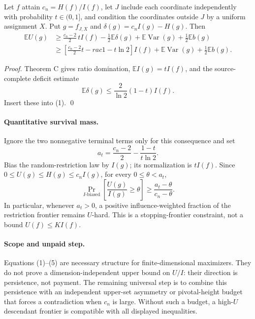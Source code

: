 \begin{corollary}
Let $f$ attain $c_n=H(f)/I(f)$, let $J$ include each coordinate independently
with probability $t\in(0,1]$, and condition the coordinates outside $J$ by a
uniform assignment $X$.  Put $g=f_{J,X}$ and
$\delta(g)=c_nI(g)-H(g)$.  Then
\[
\begin{split}
 \mathbb E U(g)
 &\ge \frac{c_n-2}{2}\,tI(f)-\frac12\mathbb E\delta(g)
       +\mathbb E\operatorname{Var}(g)+\frac12\mathbb E b(g)             \tag{3}\\
 &\ge \left[\frac{c_n-2}{2}t-rac{1-t}{\ln2}\right]I(f)
       +\mathbb E\operatorname{Var}(g)+\frac12\mathbb E b(g).           \tag{4}
\end{split}
\]
\end{corollary}

\begin{proof}
Theorem C gives ratio domination, $\mathbb E I(g)=tI(f)$, and the
source-complete deficit estimate
\[
 \mathbb E\delta(g)\le\frac{2}{\ln2}(1-t)I(f).
\]
Insert these into (1).  \qed
\end{proof}

\paragraph{Quantitative survival mass.}
Ignore the two nonnegative terminal terms only for this consequence and set
\[
 a_t=\frac{c_n-2}{2}-\frac{1-t}{t\ln2}.
\]
Bias the random-restriction law by $I(g)$; its normalization is $tI(f)$.
Since $0\le U(g)\le H(g)\le c_nI(g)$, for every $0\le\theta<a_t$,
\[
 \Pr_{I\text{-biased}}\left[\frac{U(g)}{I(g)}\ge\theta\right]
 \ge\frac{a_t-\theta}{c_n-\theta}.                         \tag{5}
\]
In particular, whenever $a_t>0$, a positive influence-weighted fraction of
the restriction frontier remains $U$-hard.  This is a stopping-frontier
constraint, not a bound $U(f)\le KI(f)$.

\paragraph{Scope and unpaid step.}
Equations (1)--(5) are necessary structure for finite-dimensional maximizers.
They do not prove a dimension-independent upper bound on $U/I$: their direction
is persistence, not payment.  The remaining universal step is to combine this
persistence with an independent upper-set asymmetry or pivotal-height budget
that forces a contradiction when $c_n$ is large.  Without such a budget, a
high-$U$ descendant frontier is compatible with all displayed inequalities.

